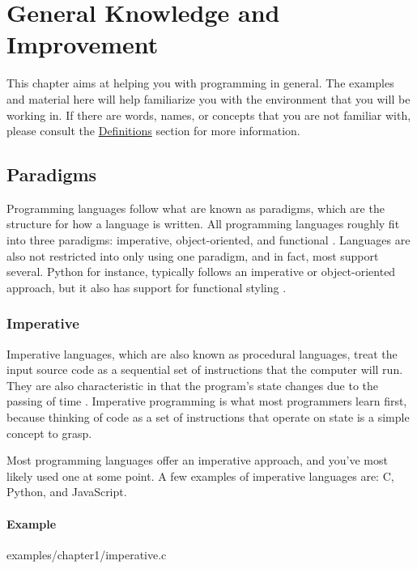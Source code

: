 \documentclass[12pt, oneside, a4paper]{book}
\begin{document}
   \newpage

   \chapter{General Knowledge and Improvement}
   \label{chap:general}
      This chapter aims at helping you with programming in general.
      The examples and material here will help familiarize you with the environment that you will be working in.
      If there are words, names, or concepts that you are not familiar with, please consult the \hyperref[chap:definitions]{Definitions} section for more information.

      \section{Paradigms}
         Programming languages follow what are known as paradigms, which are the structure for how a language is written.
         All programming languages roughly fit into three paradigms: imperative, object-oriented, and functional \autocite{normarkOverviewFourMain}.
         Languages are also not restricted into only using one paradigm, and in fact, most support several.
         Python for instance, typically follows an imperative or object-oriented approach, but it also has support for functional styling \autocite{GeneralPythonFAQ}.

         \subsection{Imperative}
         Imperative languages, which are also known as procedural languages, treat the input source code as a sequential set of instructions that the computer will run.
         They are also characteristic in that the program's state changes due to the passing of time \autocite{normarkOverviewFourMain}.
         Imperative programming is what most programmers learn first, because thinking of code as a set of instructions that operate on state is a simple concept to grasp.

         Most programming languages offer an imperative approach, and you've most likely used one at some point.
         A few examples of imperative languages are: C, Python, and JavaScript.

         \subsubsection{Example}
         
         {examples/chapter1/imperative.c}
\end{document}
